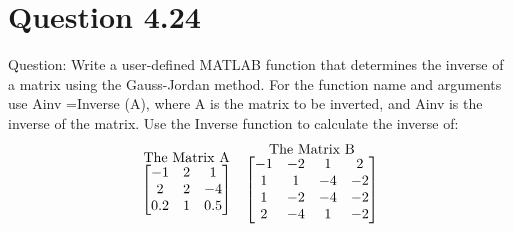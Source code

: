 \documentclass[12pt]{report}
\begin{document}
\section{Question 4.24}
Question: Write a user-defined MATLAB function that determines the inverse of a matrix using the Gauss-Jor­dan method. For the function name and arguments use Ainv =Inverse (A), where A is the matrix to be inverted, and Ainv is the inverse of the matrix. Use the Inverse function to calculate the inverse of: \[
\stackrel{\mbox{The Matrix A}}{%
\begin{bmatrix}
{-1} & {2} & {1} \\
{2} & {2} & {-4} \\
{0.2} & {1} & {0.5} 
\end{bmatrix}%
}
\quad
\stackrel{\mbox{The Matrix B}}{%
\begin{bmatrix}
{-1} & {-2} & {1} & {2} \\
{1} & {1} & {-4} & {-2} \\
{1} & {-2} & {-4} & {-2} \\
{2} & {-4} & {1} & {-2} \\
\end{bmatrix}%
}
\]
\end{document}
